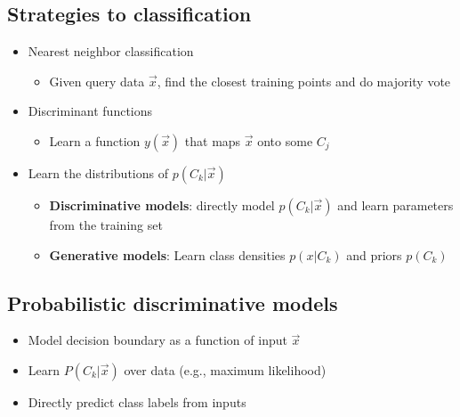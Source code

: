 \subsection{Strategies to classification}
\begin{itemize}
	\item Nearest neighbor classification
	\begin{itemize}
		\item Given query data $\vec{x}$, find the closest training points and do majority vote
	\end{itemize}
	\item Discriminant functions
	\begin{itemize}
		\item Learn a function $y(\vec{x})$ that maps $\vec{x}$ onto some $C_j$
	\end{itemize}
	\item Learn the distributions of $p(C_k|\vec{x})$
	\begin{itemize}
		\item \textbf{Discriminative models}: directly model $p(C_k|\vec{x})$ and learn parameters from the training set
		\item \textbf{Generative models}: Learn class densities $p(x|C_k)$ and priors $p(C_k)$
	\end{itemize}
\end{itemize}

\subsection{Probabilistic discriminative models}
\begin{itemize}
	\item Model decision boundary as a function of input $\vec{x}$
	\item Learn $P(C_k|\vec{x})$ over data (e.g., maximum likelihood)
	\item Directly predict class labels from inputs
\end{itemize}

